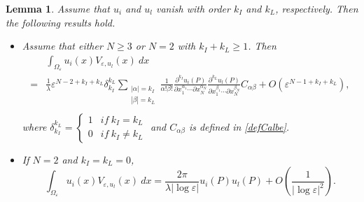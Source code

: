 \documentclass[11pt,reqno]{article}
\newtheorem{lemma}[teo]{Lemma}
\numberwithin{equation}{section}
\newcommand\e\varepsilon
\renewcommand\O\Omega
\begin{document}
    \begin{lemma}\label{lem1211-1}
        Assume that $u_i$ and $u_l$ vanish with order $k_I$ and $k_L$, respectively.  Then the following results hold.
         \begin{itemize}
             \item [$(1)$] Assume that either $N\ge 3$ or $N=2$ with $ k_I+k_L\ge 1$. Then
              \begin{equation}\label{eq1505-1}
    \begin{aligned}
        &\int_{\O_\e}u_i(x) V_{\e,u_l}(x)\ dx\\
           =&\frac{1}{\lambda }\e^{N-2+{ k_I}+{ k_L}}	\delta_{{ k_I}}^{{ k_L}}\sum_{\substack{|\alpha|={ k_I}\\
           |\beta|={ k_L}}}\frac{1}{\alpha!\beta!}\frac{\partial^{{ k_I}} u_i (P)}{\partial x_{1}^{\alpha_1}\cdots\partial x_{N}^{\alpha_N}}\frac{\partial^{{ k_L}} u_l (P)}{\partial x_{1}^{\beta_1}\cdots\partial x_{N}^{\beta_N}} C_{\alpha\beta} +O(\e^{N-1+{ k_I}+{ k_L}}),\\
              \end{aligned}
    \end{equation}
      where $\delta_{{ k_I}}^{{ k_L}}=\begin{cases}
            1 &if\ k_I=k_L\\
            0 &if\ k_I\neq k_L
        \end{cases}$ and $C_{\alpha\beta}$ is defined in \eqref{defCalbe}.

    \item[$(2)$] If $N=2$ and ${ k_I}={ k_L}=0$,
    \begin{equation}\label{eq0301-1}
        \int_{\O_\e}u_i(x) V_{\e,u_l}(x)\ dx=\frac{2\pi}{\lambda|\log \e|}u_i(P)u_l(P)+O\left(\frac{1}{|\log \e|^2}\right).
    \end{equation}
    
         \end{itemize}
    \end{lemma}
\end{document}
